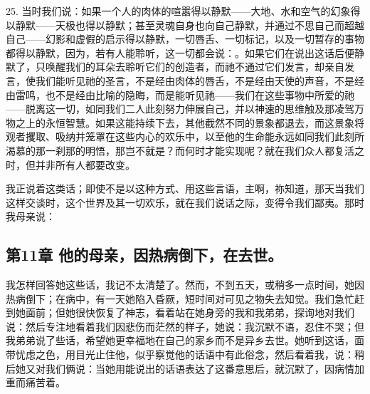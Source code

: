 25. 当时我们说：如果一个人的肉体的喧嚣得以静默——大地、水和空气的幻象得以静默——天极也得以静默；甚至灵魂自身也向自己静默，并通过不思自己而超越自己——幻影和虚假的启示得以静默，一切唇舌、一切标记，以及一切暂存的事物都得以静默，因为，若有人能聆听，这一切都会说：。如果它们在说出这话后便静默了，只唤醒我们的耳朵去聆听它们的创造者，而祂不通过它们发言，却亲自发言，使我们能听见祂的圣言，不是经由肉体的唇舌，不是经由天使的声音，不是经由雷鸣，也不是经由比喻的隐晦，而是能听见祂——我们在这些事物中所爱的祂——脱离这一切，如同我们二人此刻努力伸展自己，并以神速的思维触及那凌驾万物之上的永恒智慧。如果这能持续下去，其他截然不同的景象都退去，而这景象将观者攫取、吸纳并笼罩在这些内心的欢乐中，以至他的生命能永远如同我们此刻所渴慕的那一刹那的明悟，那岂不就是？而何时才能实现呢？就在我们众人都复活之时，但并非所有人都要改变。\par

我正说着这类话；即使不是以这种方式、用这些言语，主啊，祢知道，那天当我们这样交谈时，这个世界及其一切欢乐，就在我们说话之际，变得令我们鄙夷。那时我母亲说：\par


\subsection{第11章 他的母亲，因热病倒下，在去世。}

我怎样回答她这些话，我记不太清楚了。然而，不到五天，或稍多一点时间，她因热病倒下；在病中，有一天她陷入昏厥，短时间对可见之物失去知觉。我们急忙赶到她面前；但她很快恢复了神志，看着站在她身旁的我和我弟弟，探询地对我们说：然后专注地看着我们因悲伤而茫然的样子，她说：我沉默不语，忍住不哭；但我弟弟说了些话，希望她更幸福地在自己的家乡而不是异乡去世。她听到这话，面带忧虑之色，用目光止住他，似乎察觉他的话语中有此俗念，然后看着我，说：稍后她又对我们俩说：当她用能说出的话语表达了这番意思后，就沉默了，因病情加重而痛苦着。\par

